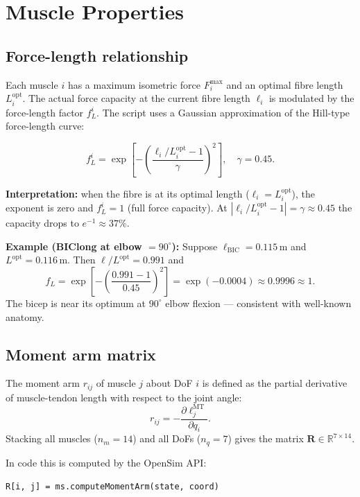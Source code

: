 \documentclass[11pt,a4paper]{article}
\begin{document}
\section{Muscle Properties}

\subsection{Force-length relationship}

Each muscle $i$ has a maximum isometric force $F_i^\text{max}$ and an
optimal fibre length $L_i^\text{opt}$. The actual force capacity at the
current fibre length $\ell_i$ is modulated by the force-length factor
$f_L^i$. The script uses a Gaussian approximation of the Hill-type
force-length curve:

\[
  \boxed{f_L^i = \exp\!\left[
    -\left(\frac{\ell_i/L_i^\text{opt} - 1}{\gamma}\right)^2
  \right]}, \quad \gamma = 0.45.
\]

\textbf{Interpretation:} when the fibre is at its optimal length
($\ell_i = L_i^\text{opt}$), the exponent is zero and $f_L^i = 1$ (full
force capacity). At $|\ell_i/L_i^\text{opt} - 1| = \gamma \approx 0.45$
the capacity drops to $e^{-1}\approx 37\%$.

\textbf{Example (BIClong at elbow $=90^\circ$):}
Suppose $\ell_\text{BIC} = 0.115\,$m and $L^\text{opt} = 0.116\,$m.
Then $\ell/L^\text{opt} = 0.991$ and
\[
  f_L = \exp\!\left[-\left(\frac{0.991-1}{0.45}\right)^2\right]
      = \exp(-0.0004) \approx 0.9996 \approx 1.
\]
The bicep is near its optimum at $90^\circ$ elbow flexion — consistent with
well-known anatomy.

\subsection{Moment arm matrix}

The moment arm $r_{ij}$ of muscle $j$ about DoF $i$ is defined as the
partial derivative of muscle-tendon length with respect to the joint angle:
\[
  r_{ij} = -\frac{\partial \ell_j^\text{MT}}{\partial q_i}.
\]
Stacking all muscles ($n_m=14$) and all DoFs ($n_q=7$) gives the matrix
$\mathbf{R}\in\mathbb{R}^{7\times14}$.

In code this is computed by the OpenSim API:
\begin{lstlisting}[caption={Moment arm via OpenSim}]
R[i, j] = ms.computeMomentArm(state, coord)
\end{lstlisting}
\end{document}
